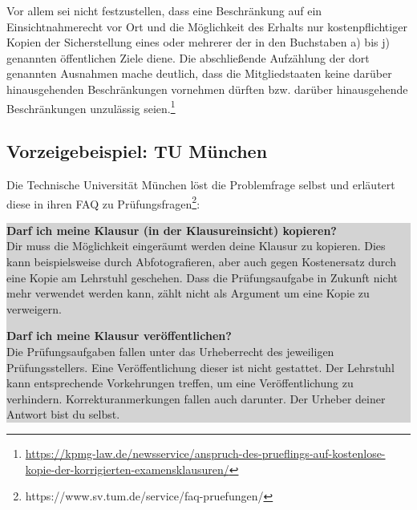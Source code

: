 \documentclass[12pt, a4paper]{article}
\begin{document}
Vor allem sei nicht festzustellen, dass eine Beschränkung auf ein Einsichtnahmerecht vor Ort und die Möglichkeit des Erhalts nur kostenpflichtiger Kopien der Sicherstellung eines oder mehrerer der in den Buchstaben a) bis j) genannten öffentlichen Ziele diene. Die abschließende Aufzählung der dort genannten Ausnahmen mache deutlich, dass die Mitgliedstaaten keine darüber hinausgehenden Beschränkungen vornehmen dürften bzw. darüber hinausgehende Beschränkungen unzulässig seien.\footnote{\href{https://kpmg-law.de/newsservice/anspruch-des-prueflings-auf-kostenlose-kopie-der-korrigierten-examensklausuren/}{https://kpmg-law.de/newsservice/anspruch-des-prueflings-auf-kostenlose-kopie-der-korrigierten-examensklausuren/}} 


\subsection{Vorzeigebeispiel: TU München}
Die Technische Universität München löst die Problemfrage selbst und erläutert diese in ihren FAQ zu Prüfungsfragen\footnote{https://www.sv.tum.de/service/faq-pruefungen/}:

\subitem\colorbox{lightgray}{
    \begin{minipage}[h]{0.9\linewidth}
        \vspace{.5cm}
        \textbf{Darf ich meine Klausur (in der Klausureinsicht) kopieren?}\\
        Dir muss die Möglichkeit eingeräumt werden deine Klausur zu kopieren. Dies kann beispielsweise durch Abfotografieren, aber auch gegen Kostenersatz durch eine Kopie am Lehrstuhl geschehen. Dass die Prüfungsaufgabe in Zukunft nicht mehr verwendet werden kann, zählt nicht als Argument um eine Kopie zu verweigern.\vspace{.5cm}

        \textbf{Darf ich meine Klausur veröffentlichen?}\\
        Die Prüfungsaufgaben fallen unter das Urheberrecht des jeweiligen Prüfungsstellers. Eine Veröffentlichung dieser ist nicht gestattet. Der Lehrstuhl kann entsprechende Vorkehrungen treffen, um eine Veröffentlichung zu verhindern. Korrekturanmerkungen fallen auch darunter. Der Urheber deiner Antwort bist du selbst.
        \vspace{.5cm}
    \end{minipage}
}
\end{document}
